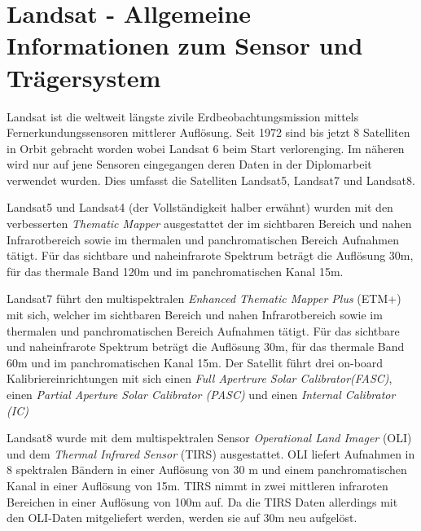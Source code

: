 \documentclass[11pt]{report}
\begin{document}


\section{Landsat - Allgemeine Informationen zum Sensor und Trägersystem}
Landsat ist die weltweit längste zivile Erdbeobachtungsmission mittels Fernerkundungssensoren  mittlerer Auflösung. Seit 1972 sind bis jetzt 8 Satelliten in Orbit gebracht worden wobei Landsat 6 beim Start verlorenging. Im näheren wird nur auf jene Sensoren eingegangen deren Daten in der Diplomarbeit verwendet wurden. Dies umfasst die Satelliten Landsat5, Landsat7 und Landsat8.

Landsat5 und Landsat4 (der Vollständigkeit halber erwähnt) wurden mit den verbesserten \textit{Thematic Mapper} ausgestattet der im sichtbaren Bereich und nahen Infrarotbereich sowie im thermalen und panchromatischen Bereich Aufnahmen tätigt. Für das sichtbare und naheinfrarote Spektrum beträgt die Auflösung 30m, für das thermale Band 120m und im panchromatischen Kanal 15m.

Landsat7 führt den multispektralen \textit{Enhanced Thematic Mapper Plus} (ETM+) mit sich, welcher im sichtbaren Bereich und nahen Infrarotbereich sowie im thermalen und panchromatischen Bereich Aufnahmen tätigt. Für das sichtbare und naheinfrarote Spektrum beträgt die Auflösung 30m, für das thermale Band 60m und im panchromatischen Kanal 15m.
Der Satellit führt drei on-board Kalibriereinrichtungen mit sich einen \textit{Full Apertrure Solar Calibrator(FASC)}, einen \textit{Partial Aperture Solar Calibrator (PASC)} und einen \textit{Internal Calibrator (IC)}

Landsat8 wurde mit dem multispektralen Sensor \textit{Operational Land Imager} (OLI) und dem \textit{Thermal Infrared Sensor} (TIRS) ausgestattet. OLI liefert Aufnahmen in 8 spektralen Bändern in einer Auflösung von 30 m und einem panchromatischen Kanal in einer Auflösung von 15m. TIRS nimmt in zwei mittleren infraroten Bereichen in einer Auflösung von 100m auf. Da die TIRS Daten allerdings mit den OLI-Daten mitgeliefert werden, werden sie auf 30m neu aufgelöst.
\end{document}

